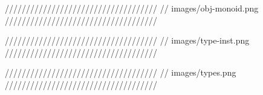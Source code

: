 
////////////////////////////////////
// images/obj-monoid.png 
////////////////////////////////////


////////////////////////////////////
// images/type-inst.png 
////////////////////////////////////

////////////////////////////////////
// images/types.png 
////////////////////////////////////

